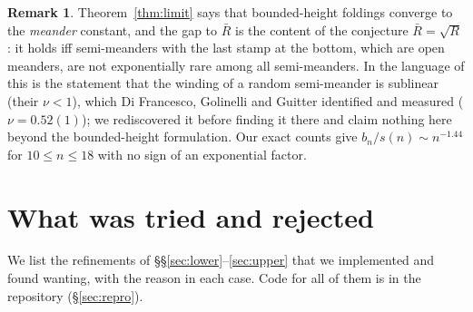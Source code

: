\documentclass[11pt]{amsart}
\theoremstyle{definition}
\newtheorem{remark}[theorem]{Remark}
\newcommand{\Rb}{\bar R}
\begin{document}
\begin{remark}
Theorem~\ref{thm:limit} says that bounded-height foldings converge to the \emph{meander} constant, and the gap to $\Rb$ is the content of the conjecture $\Rb=\sqrt R$: it holds iff semi-meanders with the last stamp at the bottom, which are open meanders, are not exponentially rare among all semi-meanders. In the language of \cite{DFGG96} this is the statement that the winding of a random semi-meander is sublinear (their $\nu<1$), which Di Francesco, Golinelli and Guitter identified and measured ($\nu=0.52(1)$); we rediscovered it before finding it there and claim nothing here beyond the bounded-height formulation. Our exact counts give $b_n/s(n)\sim n^{-1.44}$ for $10\le n\le18$ with no sign of an exponential factor.
\end{remark}

\section{What was tried and rejected}\label{sec:tried}

We list the refinements of \S\S\ref{sec:lower}--\ref{sec:upper} that we implemented and found wanting, with the reason in each case. Code for all of them is in the repository (\S\ref{sec:repro}).
\end{document}
